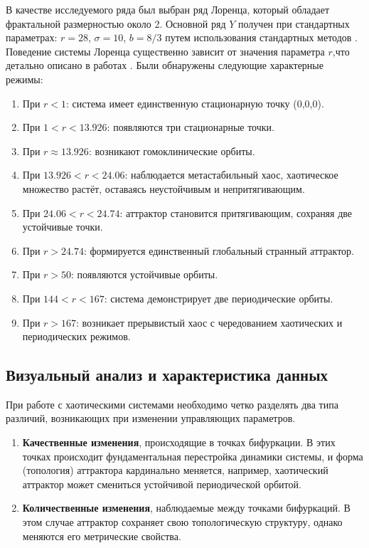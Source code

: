 \documentclass[a4paper,12pt]{extarticle}
\begin{document}
В качестве исследуемого ряда был выбран ряд Лоренца, который обладает
 фрактальной размерностью около 2. Основной ряд \(Y\) получен при стандартных
  параметрах: \(r = 28\), \(\sigma = 10\), \(b = 8/3\) путем использования стандартных методов \cite{Balashova1991}.
   Поведение системы
   Лоренца существенно зависит от значения параметра \(r\),что детально описано в
   работах \cite{KaplanYorke1979, Hateley2016}. Были обнаружены следующие характерные режимы:
\begin{enumerate}
    \item При \(r < 1\): система имеет единственную стационарную точку (0,0,0).
    \item При \(1 < r < 13.926\): появляются три стационарные точки.
    \item При \(r \approx 13.926\): возникают гомоклинические орбиты.
    \item При \(13.926 < r < 24.06\): наблюдается метастабильный хаос, хаотическое
     множество растёт, оставаясь неустойчивым и непритягивающим.
    \item При \(24.06 < r < 24.74\): аттрактор становится притягивающим, сохраняя две устойчивые точки.
    \item При \(r > 24.74\): формируется единственный глобальный странный аттрактор.
    \item При \(r > 50\): появляются устойчивые орбиты.
    \item При \(144 < r < 167\): система демонстрирует две периодические орбиты.
    \item При \(r > 167\): возникает прерывистый хаос с чередованием хаотических и периодических режимов.
\end{enumerate}

\subsection{Визуальный анализ и характеристика данных}

При работе с хаотическими системами необходимо четко разделять два
типа различий, возникающих при изменении управляющих параметров.

\begin{enumerate}
    \item \textbf{Качественные изменения}, происходящие в точках бифуркации.
     В этих точках происходит фундаментальная перестройка динамики системы, и форма (топология) аттрактора кардинально меняется, например, хаотический аттрактор может смениться устойчивой периодической орбитой.
    \item \textbf{Количественные изменения}, наблюдаемые между точками
     бифуркаций. В этом случае аттрактор сохраняет свою топологическую структуру, однако меняются его метрические свойства.
\end{enumerate}
\end{document}
